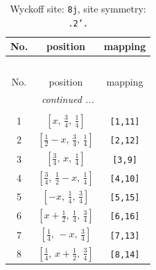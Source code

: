 \documentclass[fleqn,8pt]{jsarticle}
\begin{document}
\begin{longtable}{ccc}
\caption{Wyckoff site: {\tt 8j}, site symmetry: {\tt .2'.}}
 \\
 \hline \hline
No. & position & mapping \\ \hline \endfirsthead

\multicolumn{2}{l}{\tablename\ \thetable{}} \\
 \hline \hline
No. & position & mapping \\ \hline \endhead

 \hline \hline
\multicolumn{2}{r}{\footnotesize\it continued ...} \\ \endfoot

 \hline \hline
\multicolumn{2}{r}{} \\ \endlastfoot

1 & $\left[ x,\, \frac{3}{4},\, \frac{1}{4} \right]$ & {\tt [1,11]} \\ \hline
2 & $\left[ \frac{1}{2} - x,\, \frac{3}{4},\, \frac{1}{4} \right]$ & {\tt [2,12]} \\ \hline
3 & $\left[ \frac{3}{4},\, x,\, \frac{1}{4} \right]$ & {\tt [3,9]} \\ \hline
4 & $\left[ \frac{3}{4},\, \frac{1}{2} - x,\, \frac{1}{4} \right]$ & {\tt [4,10]} \\ \hline
5 & $\left[ - x,\, \frac{1}{4},\, \frac{3}{4} \right]$ & {\tt [5,15]} \\ \hline
6 & $\left[ x + \frac{1}{2},\, \frac{1}{4},\, \frac{3}{4} \right]$ & {\tt [6,16]} \\ \hline
7 & $\left[ \frac{1}{4},\, - x,\, \frac{3}{4} \right]$ & {\tt [7,13]} \\ \hline
8 & $\left[ \frac{1}{4},\, x + \frac{1}{2},\, \frac{3}{4} \right]$ & {\tt [8,14]} \\
\end{longtable}
\renewcommand{\arraystretch}{1.2}
\end{document}
